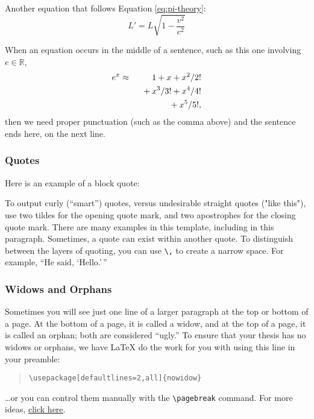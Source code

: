Another equation that follows Equation \ref{eq:pi-theory}:
\begin{equation}
    L' = {L}{\sqrt{1-\frac{v^2}{c^2}}}
\end{equation}

When an equation occurs in the middle of a sentence, such as this one involving $e \in \mathbb{R}$,
\begin{eqnarray}
 e^x &\approx& 1+x+x^2/2! \nonumber \\
   && \hphantom{1} + x^3/3! + x^4/4! \nonumber \\
   && \hphantom{1} + x^5/5!,
\end{eqnarray}
then we need proper punctuation (such as the comma above) and the sentence ends here, on the next line.

\subsubsection{Quotes}
Here is an example of a block quote:
\begin{quote}
    \lipsum[2] \citep{katz_2007}  
\end{quote}

To output curly (``smart'') quotes, versus undesirable straight quotes ("like this"), use two tildes for the opening quote mark, and two apostrophes for the closing quote mark. There are many examples in this template, including in this paragraph.
Sometimes, a quote can exist within another quote.  To distinguish between the layers of quoting, you can use \verb|\,| to create a narrow space.  For example, ``He said, `Hello.'\,''

\subsubsection{Widows and Orphans}
Sometimes you will see just one line of a larger paragraph at the top or bottom of a page.  At the bottom of a page, it is called a widow, and at the top of a page, it is called an orphan; both are considered ``ugly.''
To ensure that your thesis has no widows or orphans, we have \LaTeX{} do the work for you with using this line in your preamble:
\begin{quote}\verb|\usepackage[defaultlines=2,all]{nowidow}|\end{quote}
\ldots or you can control them manually with the \verb+\pagebreak+ command. For more ideas, \href{https://wiki.nps.edu/pages/viewpage.action?pageId=720175227}{\underline{click here}}.


